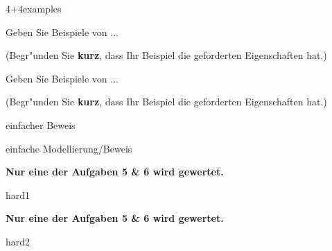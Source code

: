 \documentclass[a4paper]{article}
\begin{document}
\pagebreak
\begin{klaufg}{4+4}{examples}


  Geben Sie Beispiele von ...

  (Begr"unden Sie {\bfseries\sffamily kurz}, dass Ihr Beispiel die
  geforderten Eigenschaften hat.)
  \pagebreak
  
    Geben Sie Beispiele von ...
  
  (Begr"unden Sie {\bfseries\sffamily kurz}, dass Ihr Beispiel die
  geforderten Eigenschaften hat.)

\end{klaufg}

\pagebreak
\begin{klaufg}{8}{einfacher Beweis}

\end{klaufg}

\pagebreak
\begin{klaufg}{8}{einfache Modellierung/Beweis}

  
\end{klaufg}
 
\pagebreak
{\bfseries Nur eine der Aufgaben 5 \& 6 wird gewertet.}
\bigskip
\bigskip

\begin{klaufg}{8}{hard1}

\end{klaufg}

\pagebreak
{\bfseries Nur eine der Aufgaben 5 \& 6 wird gewertet.}
\bigskip
\bigskip

\begin{klaufg}{8}{hard2}

\end{klaufg}
\end{document}
